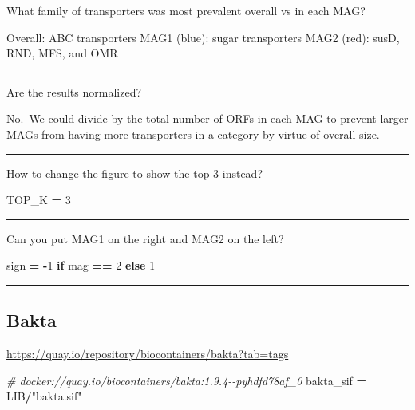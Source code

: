 \documentclass[
]{book}
\newenvironment{Shaded}{\begin{snugshade}}{\end{snugshade}}
\newcommand{\CommentTok}[1]{\textcolor[rgb]{0.56,0.35,0.01}{\textit{#1}}}
\newcommand{\ControlFlowTok}[1]{\textcolor[rgb]{0.13,0.29,0.53}{\textbf{#1}}}
\newcommand{\DecValTok}[1]{\textcolor[rgb]{0.00,0.00,0.81}{#1}}
\newcommand{\NormalTok}[1]{#1}
\newcommand{\OperatorTok}[1]{\textcolor[rgb]{0.81,0.36,0.00}{\textbf{#1}}}
\newcommand{\StringTok}[1]{\textcolor[rgb]{0.31,0.60,0.02}{#1}}
\begin{document}
What family of transporters was most prevalent overall vs in each MAG?

Overall: ABC transporters
MAG1 (blue): sugar transporters
MAG2 (red): susD, RND, MFS, and OMR

\begin{center}\rule{0.5\linewidth}{0.5pt}\end{center}

Are the results normalized?

No.~We could divide by the total number of ORFs in each MAG to prevent larger MAGs from having more transporters in a category by virtue of overall size.

\begin{center}\rule{0.5\linewidth}{0.5pt}\end{center}

How to change the figure to show the top 3 instead?

\begin{Shaded}
\begin{Highlighting}[numbers=left,,]
\NormalTok{TOP\_K }\OperatorTok{=} \DecValTok{3}
\end{Highlighting}
\end{Shaded}

\begin{center}\rule{0.5\linewidth}{0.5pt}\end{center}

Can you put MAG1 on the right and MAG2 on the left?

\begin{Shaded}
\begin{Highlighting}[numbers=left,,]
\NormalTok{    sign }\OperatorTok{=} \OperatorTok{{-}}\DecValTok{1} \ControlFlowTok{if}\NormalTok{ mag }\OperatorTok{==} \DecValTok{2} \ControlFlowTok{else} \DecValTok{1}
\end{Highlighting}
\end{Shaded}

\begin{center}\rule{0.5\linewidth}{0.5pt}\end{center}

\subsection{Bakta}\label{bakta}

\url{https://quay.io/repository/biocontainers/bakta?tab=tags}

\begin{Shaded}
\begin{Highlighting}[numbers=left,,]
\CommentTok{\# docker://quay.io/biocontainers/bakta:1.9.4{-}{-}pyhdfd78af\_0}
\NormalTok{bakta\_sif }\OperatorTok{=}\NormalTok{ LIB}\OperatorTok{/}\StringTok{"bakta.sif"}
\end{Highlighting}
\end{Shaded}
\end{document}
